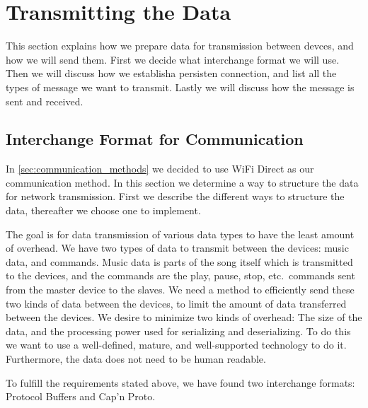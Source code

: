 \section{Transmitting the Data}\label{sec:transmitting_the_data}
This section explains how we prepare data for transmission between devces, and how we will send them.
First we decide what interchange format we will use.
Then we will discuss how we establisha persisten connection, and list all the types of message we want to transmit.
Lastly we will discuss how the message is sent and received.

\subsection{Interchange Format for Communication}\label{sec:transmit}
In \cref{sec:communication_methods} we decided to use WiFi Direct as our communication method.
In this section we determine a way to structure the data for network transmission.
First we describe the different ways to structure the data, thereafter we choose one to implement.

The goal is for data transmission of various data types to have the least amount of overhead.
We have two types of data to transmit between the devices: music data, and commands.
Music data is parts of the song itself which is transmitted to the devices,
and the commands are the play, pause, stop, etc.\ commands sent from the master device to the slaves.
We need a method to efficiently send these two kinds of data between the devices,
to limit the amount of data transferred between the devices.
We desire to minimize two kinds of overhead: The size of the data, and the processing power used for serializing and deserializing.
To do this we want to use a well-defined, mature, and well-supported technology to do it.
Furthermore, the data does not need to be human readable.

To fulfill the requirements stated above, we have found two interchange formats: Protocol Buffers and Cap'n Proto.

